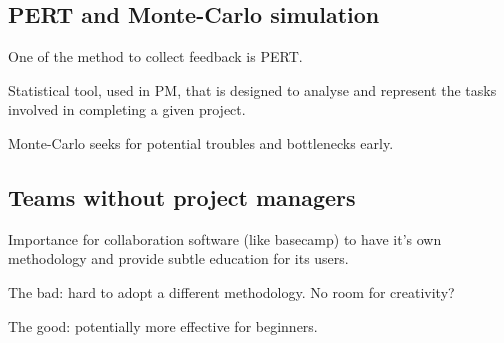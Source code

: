 \subsection{PERT and Monte-Carlo simulation}

One of the method to collect feedback is PERT.

Statistical tool, used in PM, that is designed to analyse and represent the tasks involved in completing a given project.

Monte-Carlo seeks for potential troubles and bottlenecks early.

\subsection{Teams without project managers}

Importance for collaboration software (like basecamp) to have it's own methodology and provide subtle education for its users.

The bad: hard to adopt a different methodology. No room for creativity?

The good: potentially more effective for beginners.






